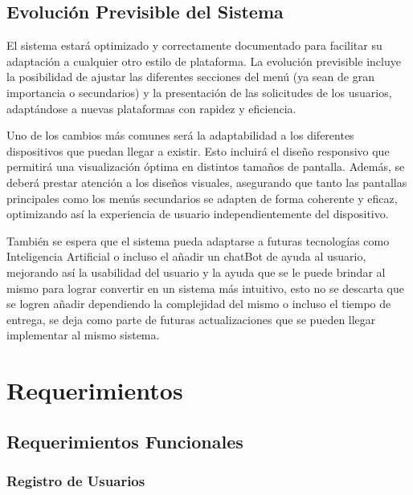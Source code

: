 	\subsection{Evolución Previsible del Sistema}

	El sistema estará optimizado y correctamente documentado para facilitar su
	adaptación a cualquier otro estilo de plataforma. La evolución previsible incluye
	la posibilidad de ajustar las diferentes secciones del menú (ya sean de gran
	importancia o secundarios) y la presentación de las solicitudes de los usuarios,
	adaptándose a nuevas plataformas con rapidez y eficiencia.

	Uno de los cambios más comunes será la adaptabilidad a los diferentes
	dispositivos que puedan llegar a existir. Esto incluirá el diseño responsivo que
	permitirá una visualización óptima en distintos tamaños de pantalla. Además, se
	deberá prestar atención a los diseños visuales, asegurando que tanto las
	pantallas principales como los menús secundarios se adapten de forma coherente
	y eficaz, optimizando así la experiencia de usuario independientemente del dispositivo.

	También se espera que el sistema pueda adaptarse a futuras tecnologías como Inteligencia
	Artificial o incluso el añadir un chatBot de ayuda al usuario, mejorando así
	la usabilidad del usuario y la ayuda que se le puede brindar al mismo para
	lograr convertir en un sistema más intuitivo, esto no se descarta que se logren
	añadir dependiendo la complejidad del mismo o incluso el tiempo de entrega, se
	deja como parte de futuras actualizaciones que se pueden llegar implementar al
	mismo sistema.

	\clearpage
	\section{Requerimientos}

	\subsection{Requerimientos Funcionales}

	\subsubsection{Registro de Usuarios}

